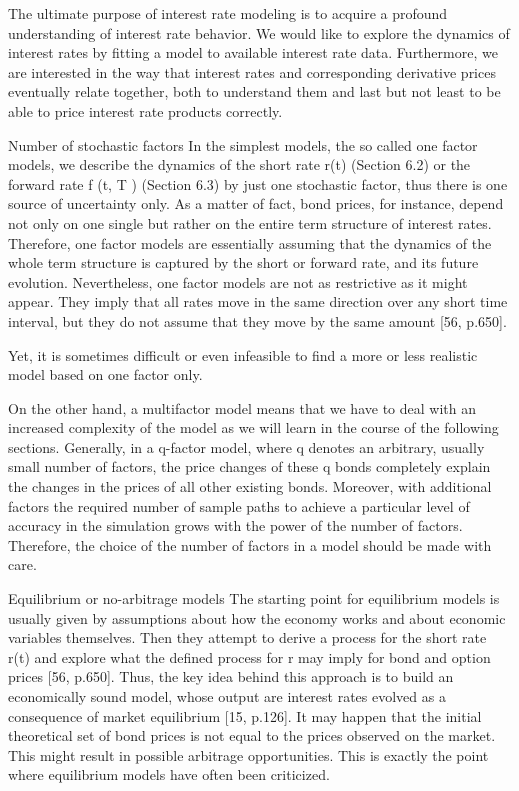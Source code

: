 The ultimate purpose of 
interest rate modeling is to acquire a profound understanding of interest 
rate behavior. We would like to explore the dynamics of interest rates by 
fitting a model to available interest rate data. Furthermore, we are 
interested in the way that interest rates and corresponding derivative 
prices eventually relate together, both to understand them and last 
but not least to be able to price interest rate products correctly.


Number of stochastic factors
In the simplest models, the so called one factor models, we describe the 
dynamics of the short rate r(t) (Section 6.2) or the forward 
rate f (t, T ) (Section 6.3) by just one stochastic factor, thus there 
is one source of uncertainty only. As a matter of fact, bond prices, 
for instance, depend not only on one single but rather on the entire 
term structure of interest rates. Therefore, one factor models are 
essentially assuming that the dynamics of the whole term structure is 
captured by the short or forward rate, and its future evolution. Nevertheless, 
one factor models are not as restrictive as it might appear. They imply 
that all rates move in the same direction over any short time interval, 
but they do not assume that they move by the same amount [56, p.650].

Yet, it is sometimes difficult or even infeasible to find a more or less 
realistic model based on one factor only. 

On the other hand, a multifactor model means that we have to deal with an 
increased complexity of the model as we will learn in the course of the 
following sections. Generally, in a q-factor model, where q denotes an 
arbitrary, usually small number of factors, the price changes of 
these q bonds completely explain the changes in the prices of all 
other existing bonds. Moreover, with additional factors the required 
number of sample paths to achieve a particular level of accuracy in the 
simulation grows with the power of the number of factors. 
Therefore, the choice of the number of factors in a model should be made with care.

Equilibrium or no-arbitrage models
The starting point for equilibrium models is usually given by 
assumptions about how the economy works and about economic 
variables themselves. Then they attempt to derive a process 
for the short rate r(t) and explore what the defined process 
for r may imply for bond and option prices [56, p.650]. Thus, 
the key idea behind this approach is to build an economically 
sound model, whose output are interest rates evolved as a consequence 
of market equilibrium [15, p.126]. It may happen that the initial 
theoretical set of bond prices is not equal to the prices observed 
on the market. This might result in possible arbitrage opportunities. 
This is exactly the point where equilibrium models have often been criticized. 

